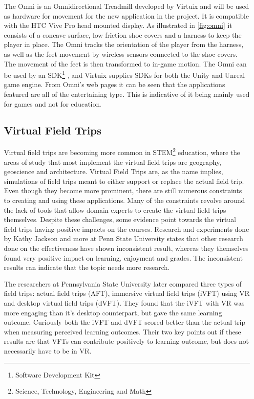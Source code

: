             The Omni is an Omnidirectional Treadmill developed by Virtuix \cite{omni} and will be used as hardware for movement for the new application in the project. It is compatible with the HTC Vive Pro head mounted display. As illustrated in \cref{fig:omni} it consists of a concave surface, low friction shoe covers and a harness to keep the player in place. The Omni tracks the orientation of the player from the harness, as well as the feet movement by wireless sensors connected to the shoe covers. The movement of the feet is then transformed to in-game motion. The Omni can be used by an SDK\footnote{Software Development Kit} \cite{omni_sdk}, and Virtuix supplies SDKs for both the Unity and Unreal game engine. From Omni's web pages it can be seen that the applications featured are all of the entertaining type. This is indicative of it being mainly used for games and not for education.
    
    \subsection{Virtual Field Trips}
        \label{sec:vft}
        Virtual field trips are becoming more common in STEM\footnote{Science, Technology, Engineering and Math} education, where the areas of study that most implement the virtual field trips are geography, geoscience and architecture. Virtual Field Trips are, as the name implies, simulations of field trips meant to either support or replace the actual field trip. Even though they become more prominent, there are still numerous constraints to creating and using these applications. Many of the constraints revolve around the lack of tools that allow domain experts to create the virtual field trips themselves\cite{vft_geoscience}. Despite these challenges, some evidence point towards the virtual field trips having positive impacts on the courses. Research and experiments done by Kathy Jackson and more \cite{ivft_effectiveness} at Penn State University states that other research done on the effectiveness have shown inconsistent result, whereas they themselves found very positive impact on learning, enjoyment and grades. The inconsistent results can indicate that the topic needs more research.
        
        The researchers at Pennsylvania State University later compared three types of field trips: actual field trips (AFT), immersive virtual field trips (iVFT) using VR and desktop virtual field trips (dVFT)\cite{learning_in_the_field}. They found that the iVFT with VR was more engaging than it's desktop counterpart, but gave the same learning outcome. Curiously both the iVFT and dVFT scored better than the actual trip when measuring perceived learning outcomes. Their two key points out if these results are that VFTs can contribute positively to learning outcome, but does not necessarily have to be in VR.
        
